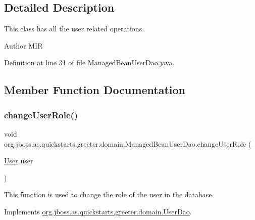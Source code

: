 \subsection{Detailed Description}
This class has all the user related operations. 

\begin{DoxyAuthor}{Author}
M\+IR 
\end{DoxyAuthor}


Definition at line 31 of file Managed\+Bean\+User\+Dao.\+java.



\subsection{Member Function Documentation}
\mbox{\label{classorg_1_1jboss_1_1as_1_1quickstarts_1_1greeter_1_1domain_1_1_managed_bean_user_dao_aefa42ba41f80108e41cdcb5cfb53520f}} 
\subsubsection{\texorpdfstring{change\+User\+Role()}{changeUserRole()}}
{\footnotesize\ttfamily void org.\+jboss.\+as.\+quickstarts.\+greeter.\+domain.\+Managed\+Bean\+User\+Dao.\+change\+User\+Role (\begin{DoxyParamCaption}\item[{\hyperlink{classorg_1_1jboss_1_1as_1_1quickstarts_1_1greeter_1_1domain_1_1_user}{User}}]{user }\end{DoxyParamCaption})}



This function is used to change the role of the user in the database. 



Implements \hyperlink{interfaceorg_1_1jboss_1_1as_1_1quickstarts_1_1greeter_1_1domain_1_1_user_dao_af4383d2e7155cdc6ad486cb55ff5915d}{org.\+jboss.\+as.\+quickstarts.\+greeter.\+domain.\+User\+Dao}.



